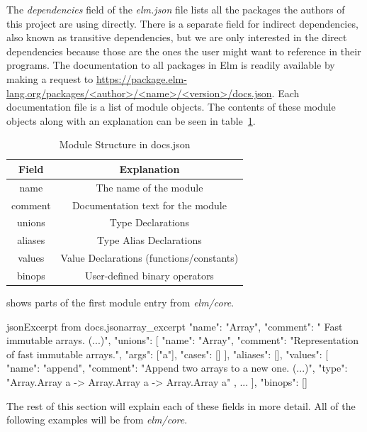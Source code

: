 \documentclass[../thesis.tex]{subfiles}
\begin{document}
The \textit{dependencies} field of the \textit{elm.json} file lists all the packages the authors of this project
are using directly.
There is a separate field for indirect dependencies, also known as transitive dependencies, 
but we are only interested in the direct dependencies because those are the ones the user might want to
reference in their programs.
The documentation to all packages in Elm is readily available by making a request to
\url{https://package.elm-lang.org/packages/<author>/<name>/<version>/docs.json}.
Each documentation file is a list of module objects.
The contents of these module objects along with an explanation can be seen in table~\ref{tab:documentation_fields}.

\begin{table}[htpb]
    \centering
    \begin{tabular}{|c|c|}
        \hline
        Field & Explanation \\
        \hline
        name & The name of the module \\
        comment & Documentation text for the module \\
        unions & Type Declarations \\
        aliases & Type Alias Declarations \\
        values & Value Declarations (functions/constants) \\
        binops & User-defined binary operators \\
        \hline
    \end{tabular}
    \caption{Module Structure in docs.json}
    \label{tab:documentation_fields}
\end{table}


 shows parts of the first module entry from \textit{elm/core}.
\begin{code}{json}{Excerpt from docs.json}{array_excerpt}
  {
    "name": "Array",
    "comment": " Fast immutable arrays. (...)",
    "unions": [
      {
        "name": "Array",
        "comment": "Representation of fast immutable arrays.",
        "args": ["a"],
        "cases": []
      }
    ],
    "aliases": [],
    "values": [
      {
        "name": "append",
        "comment": "Append two arrays to a new one. (...)",
        "type": 
            "Array.Array a -> Array.Array a -> Array.Array a"
      },
      ...
    ],
    "binops": []
  }
\end{code}
The rest of this section will explain each of these fields in more detail.
All of the following examples will be from \textit{elm/core}.
\end{document}
